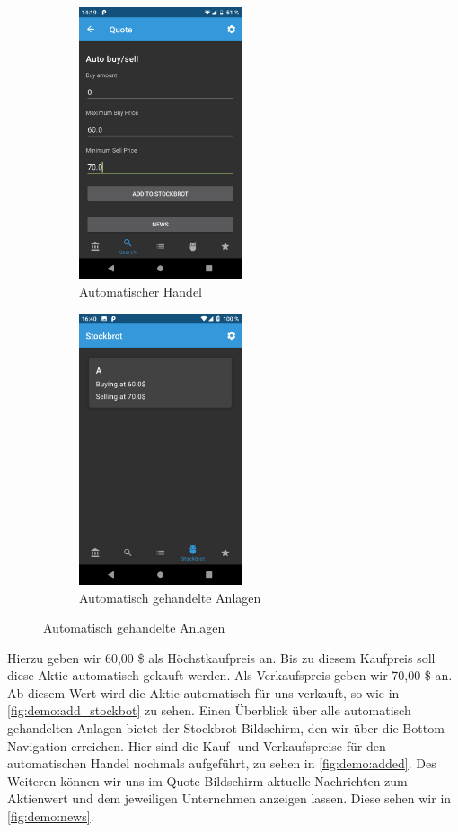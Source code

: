 \documentclass[a4paper]{article}
\begin{document}
\begin{figure}[H]
	\begin{subfigure}{.5\textwidth}
		\centering
		\includegraphics[height=8cm,keepaspectratio]{./images/demo/add_stockbot.png}
		\caption{Automatischer Handel}
		\label{fig:demo:add_stockbot}
	\end{subfigure}
	\begin{subfigure}{.5\textwidth}
		\centering
		\includegraphics[height=8cm,keepaspectratio]{./images/demo/added_stockbot_view.png}
		\caption{Automatisch gehandelte Anlagen}
		\label{fig:demo:added}
	\end{subfigure}
\end{figure}

Hierzu geben wir 60,00 \$ als Höchstkaufpreis an. Bis zu diesem Kaufpreis soll diese Aktie automatisch gekauft werden. Als Verkaufspreis geben wir 70,00 \$ an. Ab diesem Wert wird die Aktie automatisch für uns verkauft, so wie in \autoref{fig:demo:add_stockbot} zu sehen. Einen Überblick über alle automatisch gehandelten Anlagen bietet der Stockbrot-Bildschirm, den wir über die Bottom-Navigation erreichen. Hier sind die Kauf- und Verkaufspreise für den automatischen Handel nochmals aufgeführt, zu sehen in  \autoref{fig:demo:added}.\newline
Des Weiteren können wir uns im Quote-Bildschirm aktuelle Nachrichten zum Aktienwert und dem jeweiligen Unternehmen anzeigen lassen. Diese sehen wir in \autoref{fig:demo:news}.
\end{document}
